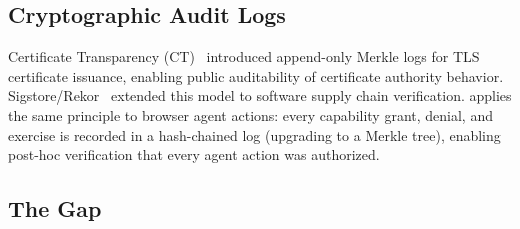 \subsection{Cryptographic Audit Logs}

Certificate Transparency (CT)~\cite{laurie2013rfc6962} introduced
append-only Merkle logs for TLS certificate issuance, enabling
public auditability of certificate authority behavior.
Sigstore/Rekor~\cite{sigstore_rekor} extended this model to
software supply chain verification.
\ferrite{} applies the same principle to browser agent actions:
every capability grant, denial, and exercise is recorded in a
hash-chained log (upgrading to a Merkle tree), enabling
post-hoc verification that every agent action was authorized.

\subsection{The Gap}

